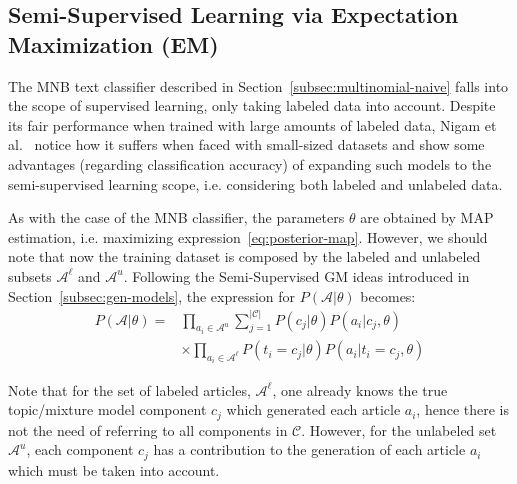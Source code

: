 \subsection{Semi-Supervised Learning via Expectation 
Maximization (EM)}
\label{subsec:semi-super-em}

The MNB text classifier described in 
Section~\ref{subsec:multinomial-naive} falls into the scope of 
supervised learning, only taking labeled data into 
account. Despite its fair performance when trained with large amounts of 
labeled data, Nigam et al.~\cite{Nigam2000} notice how it suffers when faced 
with small-sized datasets and show some advantages (regarding 
classification accuracy) of expanding such models to the semi-supervised 
learning scope, i.e. considering both labeled and 
unlabeled data.\vertbreak 



As with the case of the MNB classifier, the parameters $\theta$ are obtained 
by MAP estimation, i.e. maximizing expression~\ref{eq:posterior-map}. However, 
we should note that now the training dataset is composed by the labeled and 
unlabeled subsets $\mathcal{A}^{\ell}$ and $\mathcal{A}^{u}$. Following the 
Semi-Supervised GM ideas introduced in Section~\ref{subsec:gen-models}, the expression 
for $P(\mathcal{A}|\theta)$ becomes:
\begin{equation}
\begin{split}
    P(\mathcal{A}|\theta) = &\prod_{a_i \in \mathcal{A}^{u}}\sum_{j=1}^{|\mathcal{C}|}P(c_j|\theta)P(a_i|c_j,\theta)\\ 
    &\times \prod_{a_i \in \mathcal{A}^{\ell}}P(t_i = c_j|\theta)P(a_i|t_i = c_j,\theta)
    \label{eq:data-mixture-em}
\end{split}
\end{equation}

Note that for the set of labeled articles, $\mathcal{A}^{\ell}$, one 
already knows the true topic\slash mixture model component $c_j$ which 
generated each article $a_i$, hence there is not the need of referring to all 
components in $\mathcal{C}$. However, for the unlabeled set $\mathcal{A}^{u}$, 
each component $c_j$ has a contribution to the generation of each article $a_i$ 
which must be taken into account.\vertbreak

